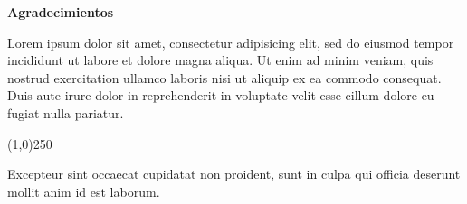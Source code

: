 \begin{center}
  \Large{\textbf{Agradecimientos}}
\end{center}

Lorem ipsum dolor sit amet, consectetur adipisicing elit, sed do eiusmod tempor incididunt ut labore et dolore magna aliqua. Ut enim ad minim veniam, quis nostrud exercitation ullamco laboris nisi ut aliquip ex ea commodo consequat. Duis aute irure dolor in reprehenderit in voluptate velit esse cillum dolore eu fugiat nulla pariatur.

\begin{center}
  \line(1,0){250}
\end{center}

Excepteur sint occaecat cupidatat non proident, sunt in culpa qui officia deserunt mollit anim id est laborum.
